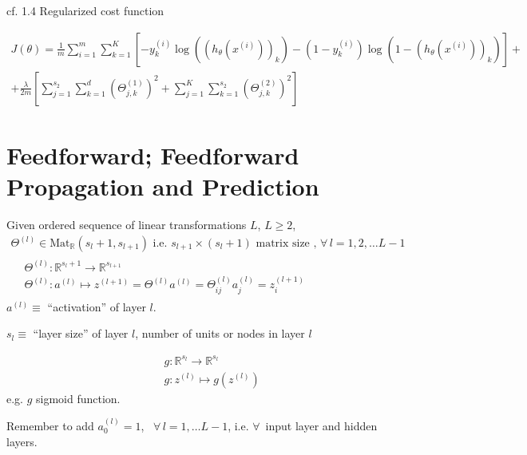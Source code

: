 \documentclass[10pt]{amsart}
\begin{document}
\begin{multicols*}{2}


cf. 1.4 Regularized cost function

\[
\begin{gathered}
  J(\theta) = \frac{1}{m} \sum_{i=1}^m \sum_{k=1}^K \left[ -y_k^{(i)} \log{ ((h_{\theta}(x^{(i)} ) )_k ) } - (1-y_k^{(i)} ) \log{ (1- (h_{\theta}(x^{(i)} ) )_k ) } \right] + \\
+ \frac{\lambda}{2m} \left[ \sum_{j=1}^{s_2} \sum_{ k=1}^{ d} (\Theta_{j,k}^{(1)} )^2 + \sum_{j=1}^{K} \sum_{k=1}^{s_2} (\Theta^{(2)}_{j,k} )^2 \right]
  \end{gathered}
\]

\section{Feedforward; Feedforward Propagation and Prediction}

Given ordered sequence of linear transformations $L$, $L\geq 2$,
\begin{equation}
\begin{gathered}
  \Theta^{(l)} \in \text{Mat}_{\mathbb{R}}( s_l + 1, s_{l+1} ) \text{ i.e. } s_{l+1} \times (s_l +1) \text{ matrix size }, \, \forall \, l = 1,2, \dots L - 1  \\
  \begin{aligned}
    & \Theta^{(l)} : \mathbb{R}^{s_l +1} \to \mathbb{R}^{s_{l+1} } \\ 
    & \Theta^{(l)} : a^{(l)} \mapsto z^{(l+1) } = \Theta^{(l)} a^{(l)} = \Theta_{ij}^{(l)} a_j^{(l)} = z_i^{(l+1)}
    \end{aligned}
\end{gathered}
\end{equation}
$a^{(l)} \equiv $ ``activation'' of layer $l$.  

$s_l \equiv $ ``layer size'' of layer $l$, number of units or nodes in layer $l$

\begin{equation}
\begin{aligned}
  & g: \mathbb{R}^{s_l } \to \mathbb{R}^{s_l} \\ 
  & g : z^{(l)} \mapsto g(z^{(l)} )
  \end{aligned}
  \end{equation}
e.g. $g$ sigmoid function.

Remember to add $a_0^{(l)} = 1$, \, $\forall \, l = 1, \dots L-1$, i.e. $\forall \, $ input layer and hidden layers.


\end{multicols*}
\end{document}
